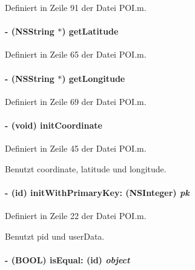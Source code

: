 Definiert in Zeile 91 der Datei POI.m.\hypertarget{interface_p_o_i_a11d6d0525235d6c73f1b8e325bd0a2b4}{
\paragraph[{getLatitude}]{\setlength{\rightskip}{0pt plus 5cm}-\/ (NSString $\ast$) getLatitude }\hfill}
\label{interface_p_o_i_a11d6d0525235d6c73f1b8e325bd0a2b4}


Definiert in Zeile 65 der Datei POI.m.\hypertarget{interface_p_o_i_abc66c92ee38bb7431e259d9b7dd0dde5}{
\paragraph[{getLongitude}]{\setlength{\rightskip}{0pt plus 5cm}-\/ (NSString $\ast$) getLongitude }\hfill}
\label{interface_p_o_i_abc66c92ee38bb7431e259d9b7dd0dde5}


Definiert in Zeile 69 der Datei POI.m.\hypertarget{interface_p_o_i_a2795a2a1abea75196a40f4af9c8f8819}{
\paragraph[{initCoordinate}]{\setlength{\rightskip}{0pt plus 5cm}-\/ (void) initCoordinate }\hfill}
\label{interface_p_o_i_a2795a2a1abea75196a40f4af9c8f8819}


Definiert in Zeile 45 der Datei POI.m.

Benutzt coordinate, latitude und longitude.\hypertarget{interface_p_o_i_aee6d78e0d5b6e4b317658b60357d5c18}{
\paragraph[{initWithPrimaryKey:}]{\setlength{\rightskip}{0pt plus 5cm}-\/ (id) initWithPrimaryKey: (NSInteger) {\em pk}}\hfill}
\label{interface_p_o_i_aee6d78e0d5b6e4b317658b60357d5c18}


Definiert in Zeile 22 der Datei POI.m.

Benutzt pid und userData.\hypertarget{interface_p_o_i_ae12986cb3bc704b2665f777d0ded8ed9}{
\paragraph[{isEqual:}]{\setlength{\rightskip}{0pt plus 5cm}-\/ (BOOL) isEqual: (id) {\em object}}\hfill}
\label{interface_p_o_i_ae12986cb3bc704b2665f777d0ded8ed9}



